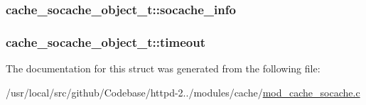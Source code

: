 \subsubsection[{\texorpdfstring{socache\+\_\+info}{socache_info}}]{ cache\+\_\+socache\+\_\+object\+\_\+t\+::socache\+\_\+info}\hypertarget{structcache__socache__object__t_a49f6b0486a38146645f859bcea663d2a}{}\label{structcache__socache__object__t_a49f6b0486a38146645f859bcea663d2a}
\subsubsection[{\texorpdfstring{timeout}{timeout}}]{ cache\+\_\+socache\+\_\+object\+\_\+t\+::timeout}\hypertarget{structcache__socache__object__t_a8be197564ae721cb3a0ea3425a5e50f6}{}\label{structcache__socache__object__t_a8be197564ae721cb3a0ea3425a5e50f6}


The documentation for this struct was generated from the following file\+:\begin{DoxyCompactItemize}
\item 
/usr/local/src/github/\+Codebase/httpd-\/2../modules/cache/\hyperlink{modules_2cache_2mod__cache__socache_8c}{mod\+\_\+cache\+\_\+socache.\+c}\end{DoxyCompactItemize}

